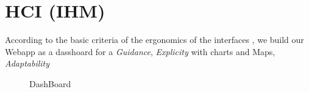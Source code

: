 \section{HCI (IHM)}
According to the basic criteria of the ergonomics of the interfaces \cite{bastien1998ergonomie}, we build our Webapp as a dasshoard for a \textit{Guidance}, \textit{Explicity} with charts and Maps, \textit{Adaptability} 
\begin{figure}[!htb]
        \caption{\label{fig:dashboard} DashBoard}
     \end{figure}
